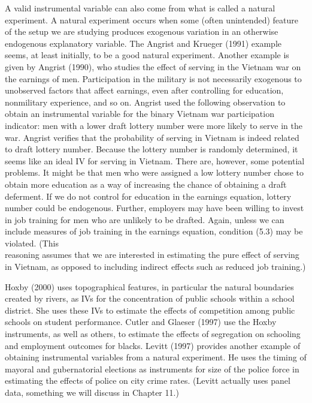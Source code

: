 \documentclass[10pt]{article}
\begin{document}
A valid instrumental variable can also come from what is called a natural experiment. A natural experiment occurs when some (often unintended) feature of the setup we are studying produces exogenous variation in an otherwise endogenous explanatory variable. The Angrist and Krueger (1991) example seems, at least initially, to be a good natural experiment. Another example is given by Angrist (1990), who studies the effect of serving in the Vietnam war on the earnings of men. Participation in the military is not necessarily exogenous to unobserved factors that affect earnings, even after controlling for education, nonmilitary experience, and so on. Angrist used the following observation to obtain an instrumental variable for the binary Vietnam war participation indicator: men with a lower draft lottery number were more likely to serve in the war. Angrist verifies that the probability of serving in Vietnam is indeed related to draft lottery number. Because the lottery number is randomly determined, it seems like an ideal IV for serving in Vietnam. There are, however, some potential problems. It might be that men who were assigned a low lottery number chose to obtain more education as a way of increasing the chance of obtaining a draft deferment. If we do not control for education in the earnings equation, lottery number could be endogenous. Further, employers may have been willing to invest in job training for men who are unlikely to be drafted. Again, unless we can include measures of job training in the earnings equation, condition (5.3) may be violated. (This\\
reasoning assumes that we are interested in estimating the pure effect of serving in Vietnam, as opposed to including indirect effects such as reduced job training.)

Hoxby (2000) uses topographical features, in particular the natural boundaries created by rivers, as IVs for the concentration of public schools within a school district. She uses these IVs to estimate the effects of competition among public schools on student performance. Cutler and Glaeser (1997) use the Hoxby instruments, as well as others, to estimate the effects of segregation on schooling and employment outcomes for blacks. Levitt (1997) provides another example of obtaining instrumental variables from a natural experiment. He uses the timing of mayoral and gubernatorial elections as instruments for size of the police force in estimating the effects of police on city crime rates. (Levitt actually uses panel data, something we will discuss in Chapter 11.)
\end{document}
